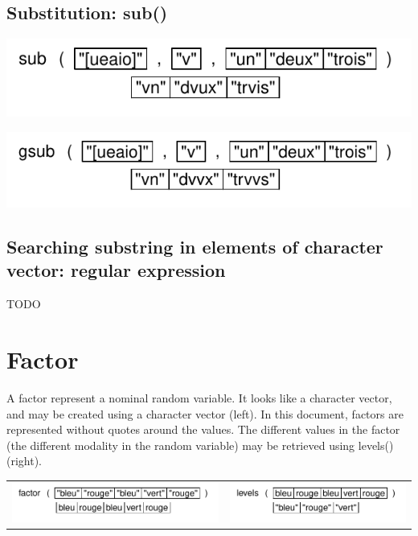 \documentclass[pdflatex]{article}
\begin{document}
\subsection{Substitution: sub()}

\includegraphics{sub}

\includegraphics{gsub}

\subsection{Searching substring in elements of character vector: regular expression}

TODO

\section{Factor}

A factor represent a nominal random variable. It looks like a character
vector, and may be created using a character vector (left). In this document,
factors are represented without quotes around the values. The different values in
the factor (the different modality in the random variable) may be retrieved
using levels() (right).

\begin{tabular}{cc}
\includegraphics{factor} & \includegraphics{levels}\\
\end{tabular}
\end{document}

